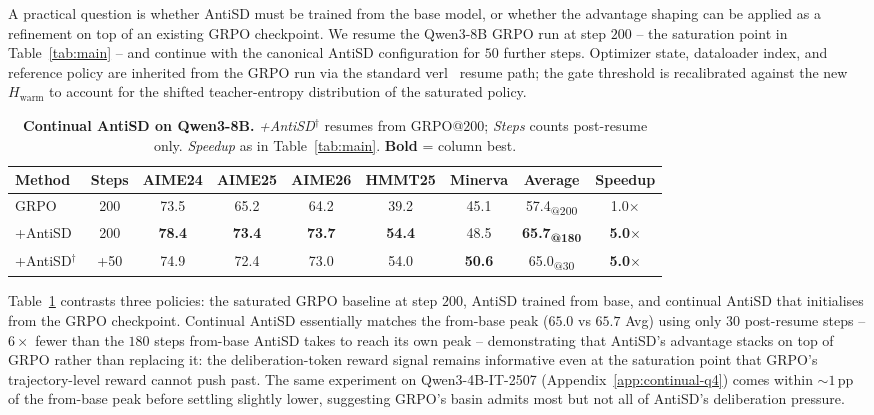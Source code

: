 \documentclass{llmxive}
\providecommand{\arraystretch}{0.95}
\begin{document}
A practical question is whether AntiSD must be trained from the base model, or whether the advantage shaping can be applied as a refinement on top of an existing GRPO checkpoint. We resume the Qwen3-8B GRPO run at step $200$ -- the saturation point in Table~\ref{tab:main} -- and continue with the canonical AntiSD configuration for $50$ further steps. Optimizer state, dataloader index, and reference policy are inherited from the GRPO run via the standard verl~\citep{sheng2025hybridflow} resume path; the gate threshold is recalibrated against the new $H_{\mathrm{warm}}$ to account for the shifted teacher-entropy distribution of the saturated policy.

\begin{table}[ht]
  \vspace{-0.5em}
  \label{tab:continual}
  \centering
  \small
  \setlength{\tabcolsep}{5pt}
  \renewcommand{\arraystretch}{0.95}
  \begin{tabular}{l|c|ccccc|c|c}
    \toprule
    \textbf{Method}                       & \textbf{Steps} & \textbf{AIME24} & \textbf{AIME25} & \textbf{AIME26} & \textbf{HMMT25} & \textbf{Minerva} & \textbf{Average}                  & \textbf{Speedup}     \\
    \midrule
    GRPO                                  & 200            & 73.5            & 65.2            & 64.2            & 39.2            & 45.1             & 57.4\textsubscript{@200}          & 1.0$\times$          \\
    +AntiSD                               & 200            & \textbf{78.4}   & \textbf{73.4}   & \textbf{73.7}   & \textbf{54.4}   & 48.5             & \textbf{65.7\textsubscript{@180}} & \textbf{5.0$\times$} \\
    \rowcolor{antisdrow} +AntiSD$^{\dag}$ & +50            & 74.9            & 72.4            & 73.0            & 54.0            & \textbf{50.6}    & 65.0\textsubscript{@30}           & \textbf{5.0$\times$} \\
    \bottomrule
  \end{tabular}
  \vspace{-.5em}
\caption{\textbf{Continual AntiSD on Qwen3-8B.} \emph{+AntiSD$^{\dag}$} resumes from GRPO@$200$; \emph{Steps} counts post-resume only. \emph{Speedup} as in Table~\ref{tab:main}. \textbf{Bold} = column best.}
\end{table}


Table~\ref{tab:continual} contrasts three policies: the saturated GRPO baseline at step $200$, AntiSD trained from base, and continual AntiSD that initialises from the GRPO checkpoint. Continual AntiSD essentially matches the from-base peak ($65.0$ vs $65.7$ Avg) using only $30$ post-resume steps -- $6\times$ fewer than the $180$ steps from-base AntiSD takes to reach its own peak -- demonstrating that AntiSD's advantage stacks on top of GRPO rather than replacing it: the deliberation-token reward signal remains informative even at the saturation point that GRPO's trajectory-level reward cannot push past. The same experiment on Qwen3-4B-IT-2507 (Appendix~\ref{app:continual-q4}) comes within $\sim 1$\,pp of the from-base peak before settling slightly lower, suggesting GRPO's basin admits most but not all of AntiSD's deliberation pressure.
\end{document}
